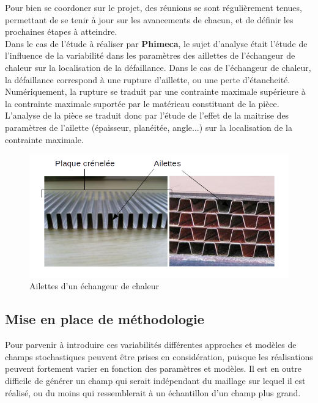 \documentclass[a4paper,10pt]{article}
\begin{document}
Pour bien se coordoner sur le projet, des réunions se sont régulièrement tenues, permettant de se tenir à jour sur les avancements de chacun, et de définir les prochaines étapes à atteindre. \\ 

Dans le cas de l'étude à réaliser par \textbf{Phimeca}, le sujet d'analyse était l'étude de l'influence de la variabilité dans les paramètres des aillettes de l'échangeur de chaleur sur la localisation de la défaillance. Dans le cas de l'échangeur de chaleur, la défaillance correspond à une rupture d'aillette, ou une perte d'étancheité. \\

Numériquement, la rupture se traduit par une contrainte maximale supérieure à la contrainte maximale suportée par le matérieau constituant de la pièce. L'analyse de la pièce se traduit donc par l'étude de l'effet de la maitrise des paramètres de l'ailette (épaisseur, planéitée, angle...) sur la localisation de la contrainte maximale. 

\begin{figure}[H]
   \centering   
   \includegraphics[scale=0.45]{SchemaAilettes.png}
      \caption{Ailettes d'un échangeur de chaleur}
         \label{SchemaAilettes}
\end{figure}

\subsection{Mise en place de méthodologie }

Pour parvenir à introduire ces variabilités différentes approches et modèles de champs stochastiques peuvent être prises en considération, puisque les réalisations peuvent fortement varier en fonction des paramètres et modèles. Il est en outre difficile de générer un champ qui serait indépendant du maillage sur lequel il est réalisé, ou du moins qui ressemblerait à un échantillon d'un champ plus grand. 
\end{document}
